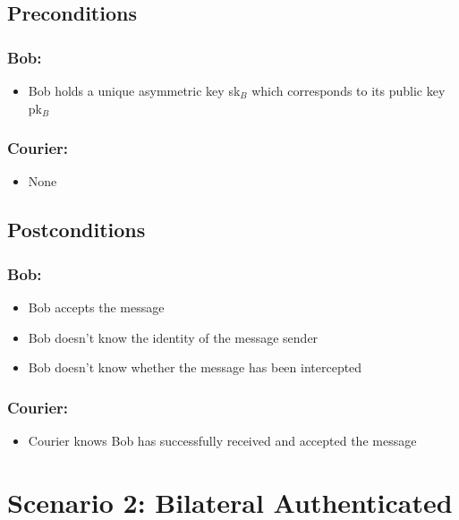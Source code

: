 \documentclass{article}
\begin{document}
\subsection*{Preconditions}
\subsubsection*{Bob:}
\begin{itemize}
\item Bob holds a unique asymmetric key sk$_B$ which corresponds to its public key pk$_B$
\end{itemize}

\subsubsection*{Courier:}
\begin{itemize}
\item None
\end{itemize}

\subsection*{Postconditions}
\subsubsection*{Bob:}
\begin{itemize}
\item Bob accepts the message
\item Bob doesn't know the identity of the message sender
\item Bob doesn't know whether the message has been intercepted
\end{itemize}

\subsubsection*{Courier:}
\begin{itemize}
\item Courier knows Bob has successfully received and accepted the message
\end{itemize}
\vspace{20pt}



\newpage
\section*{Scenario 2: Bilateral Authenticated}
\end{document}

